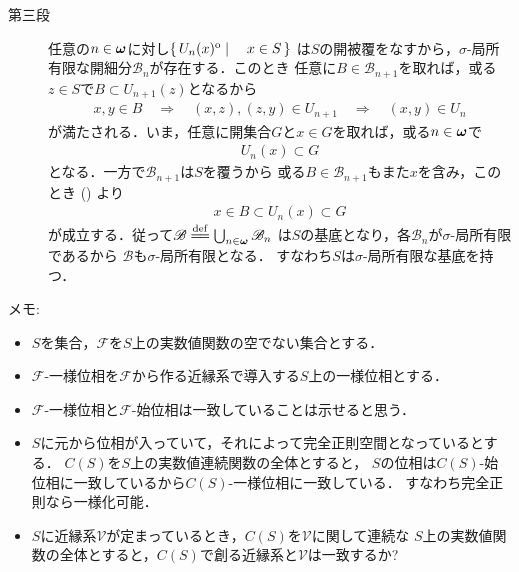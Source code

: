 \begin{prf}
\begin{description}
			\item[第三段]
				任意の$n \in {\boldsymbol \omega}$に対し$\left\{\, U_n(x)^{\mathrm{o}} \mid \quad x \in S\, \right\}$
				は$S$の開被覆をなすから，$\sigma$-局所有限な開細分$\mathscr{B}_n$が存在する．このとき
				任意に$B \in \mathscr{B}_{n+1}$を取れば，或る$z \in S$で$B \subset U_{n+1}(z)$となるから
				\begin{align}
					x,y \in B \quad\Longrightarrow\quad
					(x,z),(z,y) \in U_{n+1} \quad\Longrightarrow\quad
					(x,y) \in U_n
					\label{eq:thm_if_uniformity_has_countable_base_then_has_topology_has_sigma_locally_finite_base}
				\end{align}
				が満たされる．いま，任意に開集合$G$と$x \in G$を取れば，或る$n \in {\boldsymbol \omega}$で
				\begin{align}
					U_n(x) \subset G
				\end{align}
				となる．一方で$\mathscr{B}_{n+1}$は$S$を覆うから
				或る$B \in \mathscr{B}_{n+1}$もまた$x$を含み，このとき
				()
				より
				\begin{align}
					x \in B \subset U_n(x) \subset G
				\end{align}
				が成立する．従って$\mathscr{B} \defeq \bigcup_{n \in \Natural}\mathscr{B}_n$
				は$S$の基底となり，各$\mathscr{B}_n$が$\sigma$-局所有限であるから
				$\mathscr{B}$も$\sigma$-局所有限となる．
				すなわち$S$は$\sigma$-局所有限な基底を持つ．
				\QED
		\end{description}
	\end{prf}
	
	メモ:
	\begin{itemize}
		\item $S$を集合，$\mathscr{F}$を$S$上の実数値関数の空でない集合とする．
		\item $\mathscr{F}$-一様位相を$\mathscr{F}$から作る近縁系で導入する$S$上の一様位相とする．
		\item $\mathscr{F}$-一様位相と$\mathscr{F}$-始位相は一致していることは示せると思う．
		\item $S$に元から位相が入っていて，それによって完全正則空間となっているとする．
			$C(S)$を$S$上の実数値連続関数の全体とすると，
			$S$の位相は$C(S)$-始位相に一致しているから$C(S)$-一様位相に一致している．
			すなわち完全正則なら一様化可能．
		\item $S$に近縁系$\mathscr{V}$が定まっているとき，$C(S)$を$\mathscr{V}$に関して連続な
			$S$上の実数値関数の全体とすると，$C(S)$で創る近縁系と$\mathscr{V}$は一致するか?
	\end{itemize}
	
